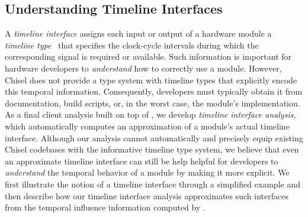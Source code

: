 \subsection{Understanding Timeline Interfaces}\label{sec:client-timeline}

A \emph{timeline interface} assigns each input or output of a hardware module a \emph{timeline type}~\cite{nigam_modular_2023} that specifies the clock-cycle intervals during which the corresponding signal is required or available.
Such information is important for hardware developers to \emph{understand} how to correctly use a module.
However, Chisel does not provide a type system with timeline types that explicitly encode this temporal information.
Consequently, developers must typically obtain it from documentation, build scripts, or, in the worst case, the module's implementation.
As a final client analysis built on top of \tia, we develop \emph{timeline interface analysis}, which automatically computes an approximation of a module's actual timeline interface.
Although our analysis cannot automatically and precisely equip existing Chisel codebases with the informative timeline type system, we believe that even an approximate timeline interface can still be help helpful for developers to \emph{understand} the temporal behavior of a module by making it more explicit.
We first illustrate the notion of a timeline interface through a simplified example and then describe how our timeline interface analysis approximates such interfaces from the temporal influence information computed by \tia.

